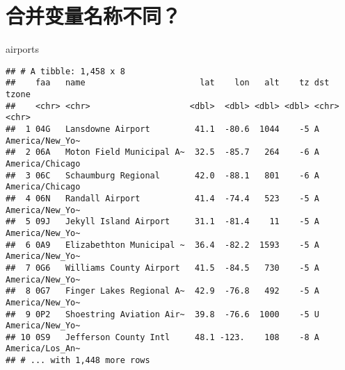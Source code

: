 \documentclass[
]{article}
\newenvironment{Shaded}{\begin{snugshade}}{\end{snugshade}}
\newcommand{\KeywordTok}[1]{\textcolor[rgb]{0.13,0.29,0.53}{\textbf{#1}}}
\newcommand{\NormalTok}[1]{#1}
\newcommand{\OperatorTok}[1]{\textcolor[rgb]{0.81,0.36,0.00}{\textbf{#1}}}
\newcommand{\StringTok}[1]{\textcolor[rgb]{0.31,0.60,0.02}{#1}}
\begin{document}
\hypertarget{ux5408ux5e76ux53d8ux91cfux540dux79f0ux4e0dux540c}{%
\section{合并变量名称不同？}\label{ux5408ux5e76ux53d8ux91cfux540dux79f0ux4e0dux540c}}

\begin{Shaded}
\begin{Highlighting}[]
\NormalTok{airports}
\end{Highlighting}
\end{Shaded}

\begin{verbatim}
## # A tibble: 1,458 x 8
##    faa   name                       lat    lon   alt    tz dst   tzone          
##    <chr> <chr>                    <dbl>  <dbl> <dbl> <dbl> <chr> <chr>          
##  1 04G   Lansdowne Airport         41.1  -80.6  1044    -5 A     America/New_Yo~
##  2 06A   Moton Field Municipal A~  32.5  -85.7   264    -6 A     America/Chicago
##  3 06C   Schaumburg Regional       42.0  -88.1   801    -6 A     America/Chicago
##  4 06N   Randall Airport           41.4  -74.4   523    -5 A     America/New_Yo~
##  5 09J   Jekyll Island Airport     31.1  -81.4    11    -5 A     America/New_Yo~
##  6 0A9   Elizabethton Municipal ~  36.4  -82.2  1593    -5 A     America/New_Yo~
##  7 0G6   Williams County Airport   41.5  -84.5   730    -5 A     America/New_Yo~
##  8 0G7   Finger Lakes Regional A~  42.9  -76.8   492    -5 A     America/New_Yo~
##  9 0P2   Shoestring Aviation Air~  39.8  -76.6  1000    -5 U     America/New_Yo~
## 10 0S9   Jefferson County Intl     48.1 -123.    108    -8 A     America/Los_An~
## # ... with 1,448 more rows
\end{verbatim}

\begin{Shaded}
\end{Shaded}
\end{document}
